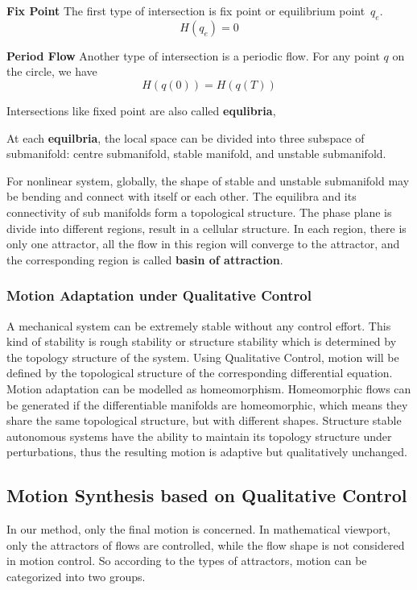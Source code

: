 \textbf{Fix Point} The first type of intersection is fix point or equilibrium point~$q_{e}$.
\[
	H(q_{e})=0
\]

\textbf {Period Flow} Another type of intersection is a periodic flow. For any point $q$ on the circle, we have
\[
	H(q(0))=H(q(T))
\]


Intersections like fixed point are also called \textbf{equlibria}, 

At each \textbf{equilbria}, 
the local space can be divided into three subspace of submanifold: centre submanifold, stable manifold, and unstable submanifold.

For nonlinear system, globally, the shape of stable and unstable submanifold may be bending and connect with itself or each other.
The equilibra and its connectivity of sub manifolds form a topological structure.
The phase plane is divide into different regions, result in a cellular structure.
In each region, there is only one attractor, all the flow in this region will converge to the attractor,
and the corresponding region is called \textbf{basin of attraction}.

\subsubsection{Motion Adaptation under Qualitative Control}
A mechanical system can be extremely stable without any control effort. This kind of stability is rough stability or structure stability \citep{Andronov1937} which is determined by the topology structure of the system\citep{Jonckheere1997}. Using Qualitative Control, motion will be defined by the topological structure of the corresponding differential equation. Motion adaptation can be modelled as homeomorphism. Homeomorphic flows can be generated if the differentiable manifolds are homeomorphic, which means they share the same topological structure, but with different shapes. Structure stable autonomous systems have the ability to maintain its topology structure under perturbations, thus the resulting motion is adaptive but qualitatively unchanged.

\subsection{Motion Synthesis based on Qualitative Control}
In our method, only the final motion is concerned. In mathematical viewport, only the attractors of flows are controlled, while the flow shape is not considered in motion control. So according to the types of attractors, motion can be categorized into two groups.

